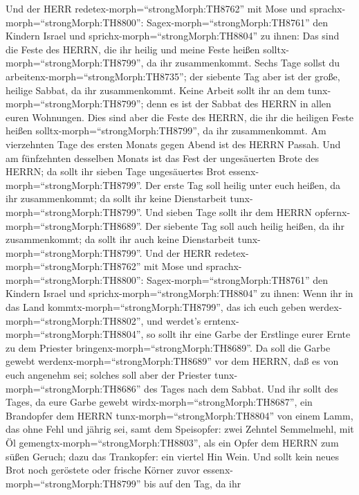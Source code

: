  Und der HERR redetex-morph=``strongMorph:TH8762'' mit Mose
und sprachx-morph=``strongMorph:TH8800'': 
Sagex-morph=``strongMorph:TH8761'' den Kindern Israel und
sprichx-morph=``strongMorph:TH8804'' zu ihnen: Das sind die Feste des
HERRN, die ihr heilig und meine Feste heißen
solltx-morph=``strongMorph:TH8799'', da ihr zusammenkommt. 
Sechs Tage sollst du arbeitenx-morph=``strongMorph:TH8735''; der
siebente Tag aber ist der große, heilige Sabbat, da ihr zusammenkommt.
Keine Arbeit sollt ihr an dem tunx-morph=``strongMorph:TH8799''; denn es
ist der Sabbat des HERRN in allen euren Wohnungen.  Dies
sind aber die Feste des HERRN, die ihr die heiligen Feste heißen
solltx-morph=``strongMorph:TH8799'', da ihr zusammenkommt. 
Am vierzehnten Tage des ersten Monats gegen Abend ist des HERRN Passah.
 Und am fünfzehnten desselben Monats ist das Fest der
ungesäuerten Brote des HERRN; da sollt ihr sieben Tage ungesäuertes Brot
essenx-morph=``strongMorph:TH8799''.  Der erste Tag soll
heilig unter euch heißen, da ihr zusammenkommt; da sollt ihr keine
Dienstarbeit tunx-morph=``strongMorph:TH8799''.  Und sieben
Tage sollt ihr dem HERRN opfernx-morph=``strongMorph:TH8689''. Der
siebente Tag soll auch heilig heißen, da ihr zusammenkommt; da sollt ihr
auch keine Dienstarbeit tunx-morph=``strongMorph:TH8799''. 
Und der HERR redetex-morph=``strongMorph:TH8762'' mit Mose und
sprachx-morph=``strongMorph:TH8800'': 
Sagex-morph=``strongMorph:TH8761'' den Kindern Israel und
sprichx-morph=``strongMorph:TH8804'' zu ihnen: Wenn ihr in das Land
kommtx-morph=``strongMorph:TH8799'', das ich euch geben
werdex-morph=``strongMorph:TH8802'', und werdet's
erntenx-morph=``strongMorph:TH8804'', so sollt ihr eine Garbe der
Erstlinge eurer Ernte zu dem Priester
bringenx-morph=``strongMorph:TH8689''.  Da soll die Garbe
gewebt werdenx-morph=``strongMorph:TH8689'' vor dem HERRN, daß es von
euch angenehm sei; solches soll aber der Priester
tunx-morph=``strongMorph:TH8686'' des Tages nach dem Sabbat.
 Und ihr sollt des Tages, da eure Garbe gewebt
wirdx-morph=``strongMorph:TH8687'', ein Brandopfer dem HERRN
tunx-morph=``strongMorph:TH8804'' von einem Lamm, das ohne Fehl und
jährig sei,  samt dem Speisopfer: zwei Zehntel Semmelmehl,
mit Öl gemengtx-morph=``strongMorph:TH8803'', als ein Opfer dem HERRN
zum süßen Geruch; dazu das Trankopfer: ein viertel Hin Wein.
 Und sollt kein neues Brot noch geröstete oder frische
Körner zuvor essenx-morph=``strongMorph:TH8799'' bis auf den Tag, da ihr
